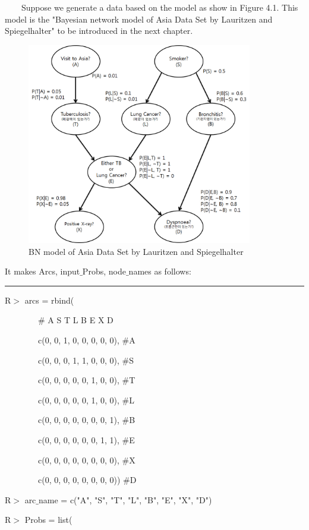 ~~~~Suppose we generate a data based on the model as show in Figure 4.1. This model is the "Bayesian network model of Asia Data Set by Lauritzen and Spiegelhalter" to be introduced in the next chapter.

\begin{figure}[t]
	\centering
	\includegraphics[height=250pt]{images/Real_Asia}
	\caption{BN model of Asia Data Set by Lauritzen and Spiegelhalter}
\end{figure}

It makes Arcs, input$\_$Probs, node$\_$names as follows:

\begin{center}\rule[0.5ex]{0.9\columnwidth}{1pt}\end{center}

R$>$ arcs = rbind(

		~~~~~~~~$\#$	A	S	T	L	B	E	X	D
		
		~~~~~~~~c(0,	0,	1,	0,	0,	0,	0,	0),	$\#$A
		
		~~~~~~~~c(0,	0,	0,	1,	1,	0,	0,	0),	$\#$S
		
		~~~~~~~~c(0,	0,	0,	0,	0,	1,	0,	0),	$\#$T
		
		~~~~~~~~c(0,	0,	0,	0,	0,	1,	0,	0),	$\#$L
		
		~~~~~~~~c(0,	0,	0,	0,	0,	0,	0,	1),	$\#$B
		
		~~~~~~~~c(0,	0,	0,	0,	0,	0,	1,	1),	$\#$E
		
		~~~~~~~~c(0,	0,	0,	0,	0,	0,	0,	0),	$\#$X
		
		~~~~~~~~c(0,	0,	0,	0,	0,	0,	0,	0))	$\#$D
		
R$>$ arc$\_$name = c("A", "S", "T", "L", "B", "E", "X", "D")

R$>$ Probs = list(

